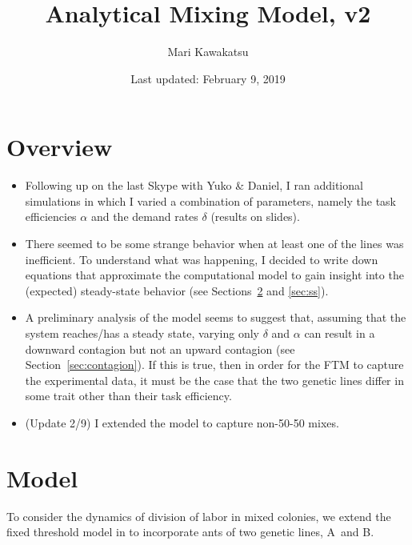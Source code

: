 \documentclass[10pt]{article}
\title{\LARGE Analytical Mixing Model, v2\vspace{-10pt}}
\author{Mari Kawakatsu\vspace{-15pt}}
\date{Last updated: February 9, 2019 \vspace{-15pt}}
\theoremstyle{remark}
\newcommand{\A}{{\color{red}A}}
\newcommand{\B}{{\color{blue}B}}
\begin{document}
\maketitle

\tableofcontents
\section{Overview}
\begin{itemize}
    \item Following up on the last Skype with Yuko \& Daniel, I ran additional simulations in which I varied a combination of parameters, namely the task efficiencies $\alpha$ and the demand rates $\delta$ (results on slides).
    
    \item There seemed to be some strange behavior when at least one of the lines was inefficient. To understand what was happening, I decided to write down equations that approximate the computational model to gain insight into the (expected) steady-state behavior (see Sections~\ref{sec:model} and \ref{sec:ss}).
    
    \item A preliminary analysis of the model seems to suggest that, assuming that the system reaches/has a steady state, varying only $\delta$ and $\alpha$ can result in a downward contagion but not an upward contagion (see Section~\ref{sec:contagion}). If this is true, then in order for the FTM to capture the experimental data, it must be the case that the two genetic lines differ in some trait other than their task efficiency.
    
    \item (Update 2/9) I extended the model to capture non-50-50 mixes.
    
\end{itemize}

\section{Model} \label{sec:model}

To consider the dynamics of division of labor in mixed colonies, we extend the fixed threshold model in \cite{ulrich18} to incorporate ants of two genetic lines, \A\ and \B. 
\end{document}
